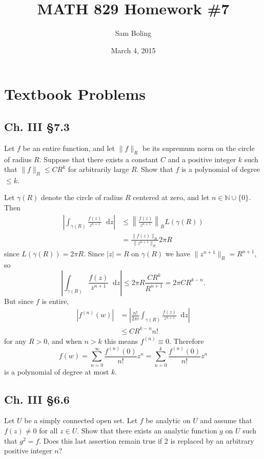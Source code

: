 \documentclass{article}
\title{MATH 829 Homework \#7}
\date{March 4, 2015}
\author{Sam Boling}
\newcommand\dif{\mathop{}\!\mathrm{d}}
\newcommand\horline{\noindent\makebox[\linewidth]{\rule{\textwidth}{0.4pt}}}
\newcounter{Problem}
\begin{document}
\begin{titlepage}
\maketitle
\end{titlepage}

\section{Textbook Problems}
\subsection*{Ch. III \S 7.3}
Let $f$ be an entire function, and let $\|f\|_R$ be its supremum
norm on the circle of radius $R$. Suppose that there exists a
constant $C$ and a positive integer $k$ such that
$\|f\|_R \leq C R^k$ for arbitrarily large $R$. Show that $f$ is a
polynomial of degree $\leq k$.

\horline

Let $\gamma(R)$ denote the circle of radius $R$ centered at zero, and
let $n \in \mathbb{N} \cup \{ 0 \}$.
Then
\begin{align*}
      \left|
        \int_{\gamma(R)} 
          \frac{f(z)}
               {z^{n+1}} 
          \dif z
      \right|
&\leq \left\|
        \frac{f(z)}{z^{n+1}}
      \right\|_{R}
      L(\gamma(R)) \\
&=    \frac{\|f(z)\|_{R}}
           {\|z^{n+1}\|_{R}}
      2 \pi R
\end{align*}
since $L(\gamma(R)) = 2 \pi R$. Since $|z| = R$ on $\gamma(R)$
we have $\|z^{n+1}\|_{R} = R^{n+1}$, so
$$
      \left|
        \int_{\gamma(R)} 
          \frac{f(z)}
               {z^{n+1}} 
          \dif z
      \right|
\leq  2 \pi R \frac{C R^k}{R^{n+1}} 
=     2 \pi C R^{k - n}.
$$
But since $f$ is entire,
\begin{align*}
   |f^{(n)}(w)|
&= \left|
     \frac{n!}
          {2 \pi i}
     \int_{\gamma(R)}
       \frac{f(z)}
            {z^{n+1}}
       \dif z
   \right| \\
&\leq
   C R^{k - n} n! 
\end{align*}
for any $R > 0$, and when $n > k$ this means $f^{(n)} \equiv 0$.
Therefore
$$
  f(w) 
= \sum_{n=0}^\infty \frac{f^{(n)}(0)}{n!} z^n 
= \sum_{n=0}^k     \frac{f^{(n)}(0)}{n!} z^n
$$ 
is a polynomial of degree at most $k$.

\subsection*{Ch. III \S 6.6}
Let $U$ be a simply connected open set. Let $f$ be analytic on
$U$ and assume that $f(z) \neq 0$ for all $z \in U$. Show that there
exists an analytic function $g$ on $U$ such that $g^2 = f$. Does this
last assertion remain true if 2 is replaced by an arbitrary positive
integer $n$?
\end{document}
